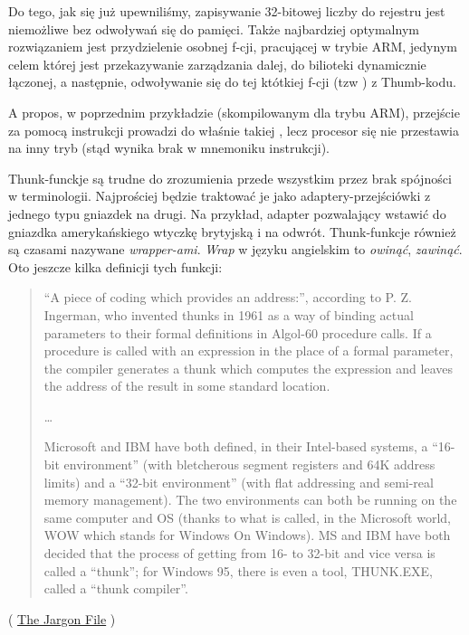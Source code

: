 Do tego, jak się już upewniliśmy, zapisywanie 32-bitowej liczby do rejestru jest niemożliwe bez odwoływań się do pamięci.
Także najbardziej optymalnym rozwiązaniem jest przydzielenie osobnej f-cji, pracującej w trybie ARM, 
jedynym celem której jest przekazywanie zarządzania dalej, do bilioteki dynamicznie łączonej, a następnie, odwoływanie się do tej któtkiej f-cji (tzw ) z Thumb-kodu.

A propos, w poprzednim przykładzie (skompilowanym dla trybu ARM), przejście za pomocą instrukcji  prowadzi 
do właśnie takiej , lecz procesor się nie przestawia na inny tryb (stąd wynika brak  w mnemoniku instrukcji).


Thunk-funckje są trudne do zrozumienia przede wszystkim przez brak spójności w terminologii.
Najprościej będzie traktować je jako adaptery-przejściówki z jednego typu gniazdek na drugi.
Na przykład, adapter pozwalający wstawić do gniazdka amerykańskiego wtyczkę brytyjską i na odwrót. Thunk-funkcje również są czasami nazywane \emph{wrapper-ami}. \emph{Wrap} w języku angielskim to \emph{owinąć}, \emph{zawinąć}.
Oto jeszcze kilka definicji tych funkcji:

\begin{framed}
\begin{quotation}
“A piece of coding which provides an address:”, according to P. Z. Ingerman, 
who invented thunks in 1961 as a way of binding actual parameters to their formal 
definitions in Algol-60 procedure calls. If a procedure is called with an expression 
in the place of a formal parameter, the compiler generates a thunk which computes 
the expression and leaves the address of the result in some standard location.

\dots

Microsoft and IBM have both defined, in their Intel-based systems, a “16-bit environment” 
(with bletcherous segment registers and 64K address limits) and a “32-bit environment” 
(with flat addressing and semi-real memory management). The two environments can both be 
running on the same computer and OS (thanks to what is called, in the Microsoft world, 
WOW which stands for Windows On Windows). MS and IBM have both decided that the process 
of getting from 16- to 32-bit and vice versa is called a “thunk”; for Windows 95, 
there is even a tool, THUNK.EXE, called a “thunk compiler”.
\end{quotation}
\end{framed}
( \href{http://go.yurichev.com/17362}{The Jargon File} )

